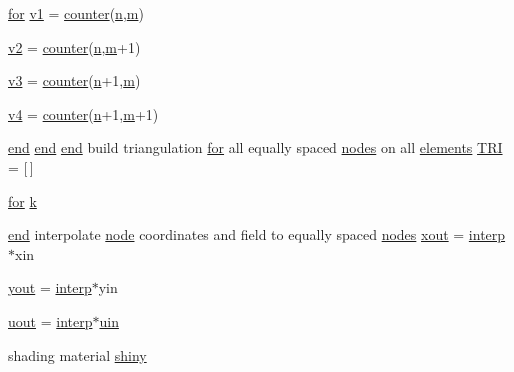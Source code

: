 \begin{DoxyCompactItemize}
\item 
\hyperlink{a00623_ad1e7380d51df1e0043d24d3c8a860e0a}{for} \hyperlink{a00563_a3d803e0c4632bc09e2b354d3f886f21d}{v1} = \hyperlink{a00563_a22845a91f919051f5ce10e0fc468c821}{counter}(\hyperlink{a00623_a781a04ab095280f838ff3eb0e51312e0}{n},\hyperlink{a00575_ab780b65adc28bca17f186bf3eebfb21d}{m})
\item 
\hyperlink{a00563_ab67228b8fa7f3169c3dc47e49373c570}{v2} = \hyperlink{a00563_a22845a91f919051f5ce10e0fc468c821}{counter}(\hyperlink{a00623_a781a04ab095280f838ff3eb0e51312e0}{n},\hyperlink{a00575_ab780b65adc28bca17f186bf3eebfb21d}{m}+1)
\item 
\hyperlink{a00563_a3a3e850fb405026b319fae4bf5794c12}{v3} = \hyperlink{a00563_a22845a91f919051f5ce10e0fc468c821}{counter}(\hyperlink{a00623_a781a04ab095280f838ff3eb0e51312e0}{n}+1,\hyperlink{a00575_ab780b65adc28bca17f186bf3eebfb21d}{m})
\item 
\hyperlink{a00563_aaa05ec51c2d691a0b7560a330374e1c4}{v4} = \hyperlink{a00563_a22845a91f919051f5ce10e0fc468c821}{counter}(\hyperlink{a00623_a781a04ab095280f838ff3eb0e51312e0}{n}+1,\hyperlink{a00575_ab780b65adc28bca17f186bf3eebfb21d}{m}+1)
\item 
\hyperlink{a00608_afb358f48b1646c750fb9da6c6585be2b}{end} \hyperlink{a00608_afb358f48b1646c750fb9da6c6585be2b}{end} \hyperlink{a00608_afb358f48b1646c750fb9da6c6585be2b}{end} build triangulation \hyperlink{a00623_ad1e7380d51df1e0043d24d3c8a860e0a}{for} all equally spaced \hyperlink{a00608_a9fd973fb7dcbed4123ae5eb2f3868e61}{nodes} on all \hyperlink{a00617_aa9aaa650bacb9b91c82437c2ce48f50c}{elements} \hyperlink{a00563_a558baeb50ad046e899b5e64f957b043f}{T\+RI} = \mbox{[}$\,$\mbox{]}
\item 
\hyperlink{a00623_ad1e7380d51df1e0043d24d3c8a860e0a}{for} \hyperlink{a00563_a1c73327b2882639bc9f5e416bb3cc7ac}{k}
\item 
\hyperlink{a00608_afb358f48b1646c750fb9da6c6585be2b}{end} interpolate \hyperlink{a00611_adf51fe9945b6ca147057cc27ff639d0f}{node} coordinates and field to equally spaced \hyperlink{a00608_a9fd973fb7dcbed4123ae5eb2f3868e61}{nodes} \hyperlink{a00563_aa43b7c30923e8fcf939fe12082a19359}{xout} = \hyperlink{a00563_a7626c967b638c3cc70c7c96863cbd07f}{interp}$\ast$xin
\item 
\hyperlink{a00563_a440aa7a05dec25dc6fe586eaa162395b}{yout} = \hyperlink{a00563_a7626c967b638c3cc70c7c96863cbd07f}{interp}$\ast$yin
\item 
\hyperlink{a00563_a5c8d8342682becd112eb9de226d6053f}{uout} = \hyperlink{a00563_a7626c967b638c3cc70c7c96863cbd07f}{interp}$\ast$\hyperlink{a00473_ab528855467ba0360924bbd0dd81edb35}{uin}
\item 
shading material \hyperlink{a00563_ab63d4993b30151e0a639ef14110d91e6}{shiny}
\end{DoxyCompactItemize}


